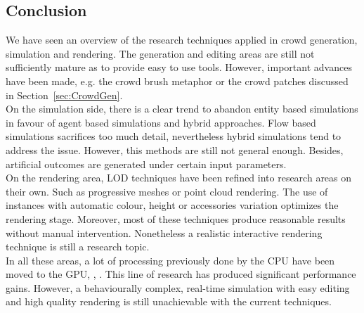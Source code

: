\documentclass[6pt]{article} %
\begin{document}
\begin{multicols}{2}
\section{Conclusion}
We have seen an overview of the research techniques applied in crowd generation, simulation and rendering.
The generation and editing areas are still not sufficiently mature as to provide easy to use tools.
However, important advances have been made, e.g. the crowd brush metaphor or the crowd patches discussed in Section~\ref{sec:CrowdGen}.\\

On the simulation side, there is a clear trend to abandon entity based simulations in favour of agent based simulations and hybrid approaches.
Flow based simulations sacrifices too much detail, nevertheless hybrid simulations tend to address the issue.
However, this methods are still not general enough.
Besides, artificial outcomes are generated under certain input parameters.\\

On the rendering area, LOD techniques have been refined into research areas on their own.
Such as progressive meshes or point cloud rendering.
The use of instances with automatic colour, height or accessories variation optimizes the rendering stage.
Moreover, most of these techniques produce reasonable results without manual intervention.
Nonetheless a realistic interactive rendering technique is still a research topic.\\

In all these areas, a lot of processing previously done by the CPU have been moved to the GPU, \cite{Hu2009}, \cite{Millan2006}.
This line of research has produced significant performance gains.
However, a behaviourally complex, real-time simulation with easy editing and high quality rendering is still unachievable with the current techniques.

\end{multicols}
\end{document}
